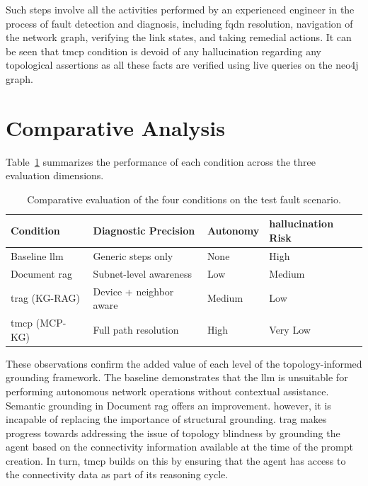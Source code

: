 \documentclass[11pt,a4paper]{report}
\begin{document}
Such steps involve all the activities performed by an experienced engineer in the process of fault detection and diagnosis, including \gls{fqdn} resolution, navigation of the network graph, verifying the link states, and taking remedial actions. It can be seen that  \gls{tmcp}  condition is devoid of any \gls{hallucination} regarding any topological assertions as all these facts are verified using live queries on the  \gls{neo4j}  graph.

\section{Comparative Analysis}

Table~\ref{tab:eval} summarizes the performance of each condition 
across the three evaluation dimensions.

\begin{table}[H]
\centering
\caption{Comparative evaluation of the four conditions on the 
test fault scenario.}
\label{tab:eval}
\small
\begin{tabular}{p{3.5cm} p{2.8cm} p{2.8cm} p{3cm}}
\toprule
\textbf{Condition} & \textbf{Diagnostic Precision} & 
\textbf{Autonomy} & \textbf{\gls{hallucination} Risk} \\
\midrule
Baseline \gls{llm}           & Generic steps only      & None       & High \\[4pt]
Document  \gls{rag}           & Subnet-level awareness  & Low        & Medium \\[4pt]
 \gls{trag}  (KG-RAG)        & Device + neighbor aware & Medium     & Low \\[4pt]
 \gls{tmcp}  (MCP-KG)        & Full path resolution    & High       & Very Low \\
\bottomrule
\end{tabular}
\end{table}

These observations confirm the added value of each level of the topology-informed \gls{grounding} framework. The baseline demonstrates that the \gls{llm}  is unsuitable for performing autonomous network operations without contextual assistance. Semantic \gls{grounding} in Document  \gls{rag}  offers an improvement. however, it is incapable of replacing the importance of structural \gls{grounding}.  \gls{trag}  makes progress towards addressing the issue of topology blindness by \gls{grounding} the agent based on the connectivity information available at the time of the prompt creation. In turn,  \gls{tmcp}  builds on this by ensuring that the agent has access to the connectivity data as part of its reasoning cycle.
\end{document}
